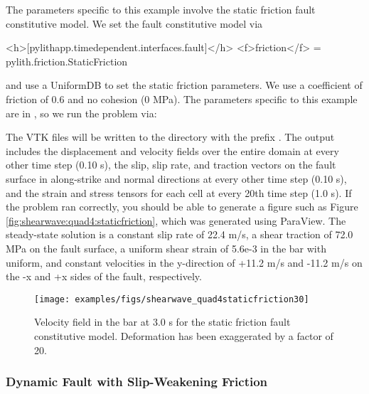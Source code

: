 The parameters specific to this example involve the static friction
fault constitutive model. We set the fault constitutive model via
\begin{cfg}
<h>[pylithapp.timedependent.interfaces.fault]</h>
<f>friction</f> = pylith.friction.StaticFriction
\end{cfg}
and use a UniformDB to set the static friction parameters. We use
a coefficient of friction of 0.6 and no cohesion (0 MPa). The parameters
specific to this example are in ,
so we run the problem via:
The VTK files will be written to the  directory with
the prefix . The output includes the displacement
and velocity fields over the entire domain at every other time step
(0.10 s), the slip, slip rate, and traction vectors on the fault surface
in along-strike and normal directions at every other time step (0.10
s), and the strain and stress tensors for each cell at every 20th
time step (1.0 s). If the problem ran correctly, you should be able
to generate a figure such as Figure \vref{fig:shearwave:quad4:staticfriction},
which was generated using ParaView. The steady-state solution is a
constant slip rate of 22.4 m/s, a shear traction of 72.0 MPa on the
fault surface, a uniform shear strain of 5.6e-3 in the bar with uniform,
and constant velocities in the y-direction of +11.2 m/s and -11.2
m/s on the -x and +x sides of the fault, respectively.

\begin{figure}
  \texttt{[image: examples/figs/shearwave\_quad4staticfriction30]}
  \caption{Velocity field in the bar at 3.0 s for the static friction fault constitutive
    model. Deformation has been exaggerated by a factor of 20.}
  \label{fig:shearwave:quad4:staticfriction}
\end{figure}


\subsubsection{Dynamic Fault with Slip-Weakening Friction}

